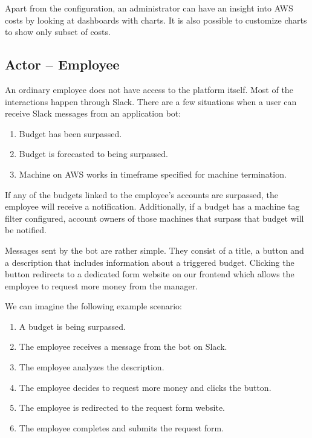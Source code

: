 \documentclass[licencjacka,en]{thesisclass}
\begin{document}
    Apart from the configuration, an administrator can have an insight
    into AWS costs by looking at dashboards with charts.
    It is also possible to customize charts to show only subset of costs.

    \subsection{Actor -- Employee}
    An ordinary employee does not have access to the platform itself.
    Most of the interactions happen through Slack.
    There are a few situations when a user can receive Slack messages from an application bot:

    \begin{enumerate}
        \item Budget has been surpassed.
        \item Budget is forecasted to being surpassed.
        \item Machine on AWS works in timeframe specified for machine termination.
    \end{enumerate}

    If any of the budgets linked to the employee's accounts are surpassed,
    the employee will receive a notification.
    Additionally, if a budget has a machine tag filter configured,
    account owners of those machines that surpass that budget will be notified.

    Messages sent by the bot are rather simple.
    They consist of a title, a button and a description that includes
    information about a triggered budget.
    Clicking the button redirects to a dedicated form website on our frontend
    which allows the employee to request more money from the manager.

    \bigskip

    We can imagine the following example scenario:
    \begin{enumerate}
        \item A budget is being surpassed.
        \item The employee receives a message from the bot on Slack.
        \item The employee analyzes the description.
        \item The employee decides to request more money and clicks the button.
        \item The employee is redirected to the request form website.
        \item The employee completes and submits the request form.
    \end{enumerate}
\end{document}
